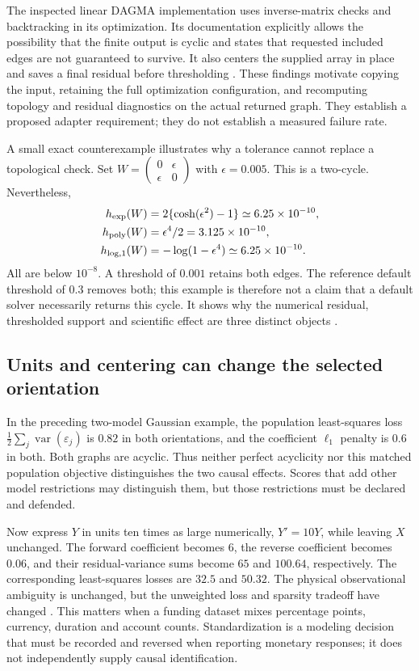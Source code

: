 The inspected linear DAGMA implementation uses inverse-matrix checks and
backtracking in its optimization. Its documentation explicitly allows the
possibility that the finite output is cyclic and states that requested included
edges are not guaranteed to survive. It also centers the supplied array in
place and saves a final residual before thresholding
\citep{exec13_pydisc_dagma}. These findings motivate copying the input,
retaining the full optimization configuration, and recomputing topology and
residual diagnostics on the actual returned graph. They establish a proposed
adapter requirement; they do not establish a measured failure rate.

A small exact counterexample illustrates why a tolerance cannot replace a
topological check. Set
\(W=\left(\begin{smallmatrix}0&\epsilon\\\epsilon&0\end{smallmatrix}\right)\)
with \(\epsilon=0.005\). This is a two-cycle. Nevertheless,
\begin{align}
 h_{\exp}(W)&=2\{\cosh(\epsilon^2)-1\}\simeq6.25\times10^{-10},\\
 h_{\rm poly}(W)&=\epsilon^4/2=3.125\times10^{-10},\\
 h_{\log,1}(W)&=-\log(1-\epsilon^4)\simeq6.25\times10^{-10}.
\end{align}
All are below \(10^{-8}\). A threshold of \(0.001\) retains both edges. The
reference default threshold of \(0.3\) removes both; this example is therefore
not a claim that a default solver necessarily returns this cycle. It shows
why the numerical residual, thresholded support and scientific effect are
three distinct objects \citep{exec13_pydisc_examples}.

\subsection{Units and centering can change the selected orientation}

In the preceding two-model Gaussian example, the population least-squares
loss \(\tfrac12\sum_j\operatorname{var}(\varepsilon_j)\) is \(0.82\) in
both orientations, and the coefficient \(\ell_1\) penalty is \(0.6\) in both.
Both graphs are acyclic. Thus neither perfect acyclicity nor this matched
population objective distinguishes the two causal effects. Scores that add
other model restrictions may distinguish them, but those restrictions must be
declared and defended.

Now express \(Y\) in units ten times as large numerically, \(Y'=10Y\), while
leaving \(X\) unchanged. The forward coefficient becomes \(6\), the reverse
coefficient becomes \(0.06\), and their residual-variance sums become \(65\)
and \(100.64\), respectively. The corresponding least-squares losses are
\(32.5\) and \(50.32\). The physical observational ambiguity is unchanged,
but the unweighted loss and sparsity tradeoff have changed
\citep{exec13_pydisc_examples}. This matters when a funding dataset mixes
percentage points, currency, duration and account counts. Standardization is a
modeling decision that must be recorded and reversed when reporting monetary
responses; it does not independently supply causal identification.

